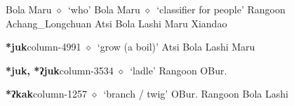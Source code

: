 \hspace{1ex}
         Bola 
\hspace{1ex}
         Maru 
\hspace{1ex}
         $\diamond$~`who'
         Bola 
\hspace{1ex}
         Maru 
\hspace{1ex}
         $\diamond$~`classifier for people'
         Rangoon 
\hspace{1ex}
         Achang\_Longchuan 
\hspace{1ex}
         Atsi 
\hspace{1ex}
         Bola 
\hspace{1ex}
         Lashi 
\hspace{1ex}
         Maru 
\hspace{1ex}
         Xiandao 
  \item {\footnotesize \textbf{*juk}}{\tiny column-4991}
         $\diamond$~`grow (a boil)'
         Atsi 
\hspace{1ex}
         Bola 
\hspace{1ex}
         Lashi 
\hspace{1ex}
         Maru 
  \item {\footnotesize \textbf{*juk, *ʔjuk}}{\tiny column-3534}
         $\diamond$~`ladle'
         Rangoon 
\hspace{1ex}
         OBur. 
  \item {\footnotesize \textbf{*ʔkak}}{\tiny column-1257}
         $\diamond$~`branch / twig'
         OBur. 
\hspace{1ex}
         Rangoon 
\hspace{1ex}
         Bola 
\hspace{1ex}
         Lashi 
